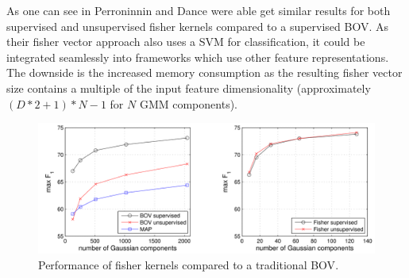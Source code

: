As one can see in  Perroninnin and Dance were able get similar results for both supervised and unsupervised fisher kernels compared to a supervised \ac{BOV}. As their fisher vector approach also uses a \ac{SVM} for classification, it could be integrated seamlessly into frameworks which use other feature representations. The downside is the increased memory consumption as the resulting fisher vector size contains a multiple of the input feature dimensionality (approximately $(D*2+1)*N-1$ for $N$ \ac{GMM} components).

\begin{figure}
\includegraphics[width=\linewidth]{images/fisher_kernel_performance}
\caption{Performance of fisher kernels compared to a traditional \acs{BOV}.}
\label{fig:fisher_kernel_performance}
\end{figure}

\FloatBarrier